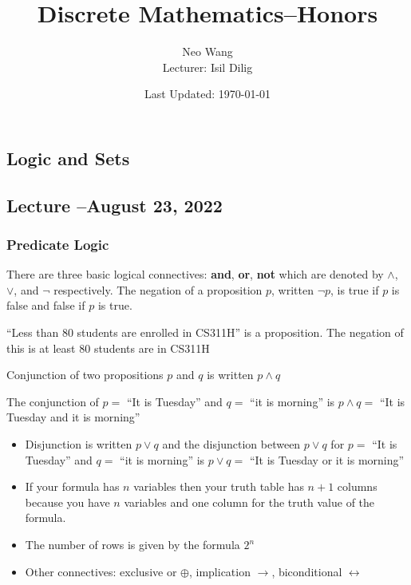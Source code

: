 \documentclass[8pt]{scrreprt}
\title{Discrete Mathematics--Honors}
\author{Neo Wang\\ Lecturer: Isil Dilig}
\date{Last Updated: \today}
\begin{document}
\begin{landscape}
\maketitle
\tableofcontents

\begin{multicols*}{3}

\chapter{Logic and Sets}

\section{Lecture --August 23, 2022}
\subsection{Predicate Logic}

There are three basic logical connectives: \textbf{and}, \textbf{or}, \textbf{not}
which are denoted by $\land$, $\lor$, and $\neg$ respectively.
The negation of a proposition $p$, written $\neg p$, is true if $p$ is false and false if $p$ is true.

\begin{example}
	``Less than 80 students are enrolled in CS311H'' is a proposition. The negation of this is at least $80$ students are in CS311H
\end{example}

Conjunction of two propositions $p$ and $q$ is written $p\land q$

\begin{example}
	The conjunction of $p=$ ``It is Tuesday'' and $q=$ ``it is morning'' is $p\land q=$ ``It is Tuesday and it is morning''
\end{example}

\begin{itemize}
	\item Disjunction is written $p\lor q$ and the disjunction between $p\lor q$ for $p=$ ``It is Tuesday'' and $q=$ ``it is morning'' is $p\lor q=$ ``It is Tuesday or it is morning''
	\item If your formula has $n$ variables then your truth table has $n+1$ columns because you have $n$ variables and one column for the truth value of the formula.
	\item The number of rows is given by the formula $2^n$
	\item Other connectives: exclusive or $\oplus$, implication $\rightarrow$, biconditional $\leftrightarrow$
\end{itemize}


\end{multicols*}
\end{landscape}
\end{document}
